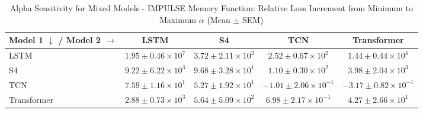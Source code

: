 
\begin{table}[h]
\centering
\caption{Alpha Sensitivity for Mixed Models - IMPULSE Memory Function: Relative Loss Increment from Minimum to Maximum $\alpha$ (Mean $\pm$ SEM)}
\label{tab:mixed_alpha_sensitivity_impulse}
\begin{tabular}{lcccc}
\hline
Model 1 $\downarrow$ / Model 2 $\rightarrow$ & LSTM & S4 & TCN & Transformer \\
\hline
LSTM & $1.95 \pm 0.46 \times 10^{7}$ & $3.72 \pm 2.11 \times 10^{3}$ & $2.52 \pm 0.67 \times 10^{2}$ & $1.44 \pm 0.44 \times 10^{4}$ \\
S4 & $9.22 \pm 6.22 \times 10^{3}$ & $9.68 \pm 3.28 \times 10^{1}$ & $1.10 \pm 0.30 \times 10^{2}$ & $3.98 \pm 2.04 \times 10^{3}$ \\
TCN & $7.59 \pm 1.16 \times 10^{1}$ & $5.27 \pm 1.92 \times 10^{1}$ & $-1.01 \pm 2.06 \times 10^{-1}$ & $-3.17 \pm 0.82 \times 10^{-1}$ \\
Transformer & $2.88 \pm 0.73 \times 10^{3}$ & $5.64 \pm 5.09 \times 10^{2}$ & $6.98 \pm 2.17 \times 10^{-1}$ & $4.27 \pm 2.66 \times 10^{1}$ \\
\hline
\end{tabular}
\end{table}
